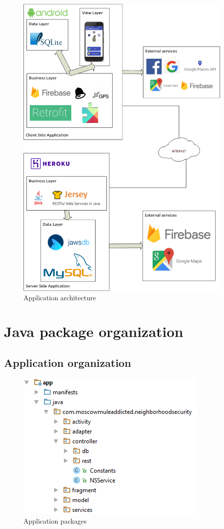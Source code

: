\documentclass[a4paper]{scrreprt}
\begin{document}
\begin{figure}[H]
	\centering
	\includegraphics[width=0.95\textwidth]{structure}
	\caption{Application architecture}
\end{figure}


\section{Java package organization}
\subsection{Application organization}
\begin{figure}[H]
	\centering
	\includegraphics{packages}
	\caption{Application packages}
\end{figure}
\end{document}
